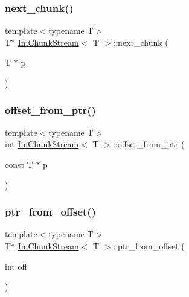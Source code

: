 \mbox{\label{structImChunkStream_a279ef3799a73ef047ca26a55aefb726e}} 
\subsubsection{\texorpdfstring{next\+\_\+chunk()}{next\_chunk()}}
{\footnotesize\ttfamily template$<$typename T$>$ \\
T$\ast$ \hyperlink{structImChunkStream}{Im\+Chunk\+Stream}$<$ T $>$\+::next\+\_\+chunk (\begin{DoxyParamCaption}\item[{T $\ast$}]{p }\end{DoxyParamCaption})\hspace{0.3cm}{\ttfamily [inline]}}

\mbox{\label{structImChunkStream_ab3dccb857d0b35ae295d14ff7f9dd0ac}} 
\subsubsection{\texorpdfstring{offset\+\_\+from\+\_\+ptr()}{offset\_from\_ptr()}}
{\footnotesize\ttfamily template$<$typename T$>$ \\
int \hyperlink{structImChunkStream}{Im\+Chunk\+Stream}$<$ T $>$\+::offset\+\_\+from\+\_\+ptr (\begin{DoxyParamCaption}\item[{const T $\ast$}]{p }\end{DoxyParamCaption})\hspace{0.3cm}{\ttfamily [inline]}}

\mbox{\label{structImChunkStream_a88e60ac2db2c90e8bccff3b48a2a03b3}} 
\subsubsection{\texorpdfstring{ptr\+\_\+from\+\_\+offset()}{ptr\_from\_offset()}}
{\footnotesize\ttfamily template$<$typename T$>$ \\
T$\ast$ \hyperlink{structImChunkStream}{Im\+Chunk\+Stream}$<$ T $>$\+::ptr\+\_\+from\+\_\+offset (\begin{DoxyParamCaption}\item[{int}]{off }\end{DoxyParamCaption})\hspace{0.3cm}{\ttfamily [inline]}}

